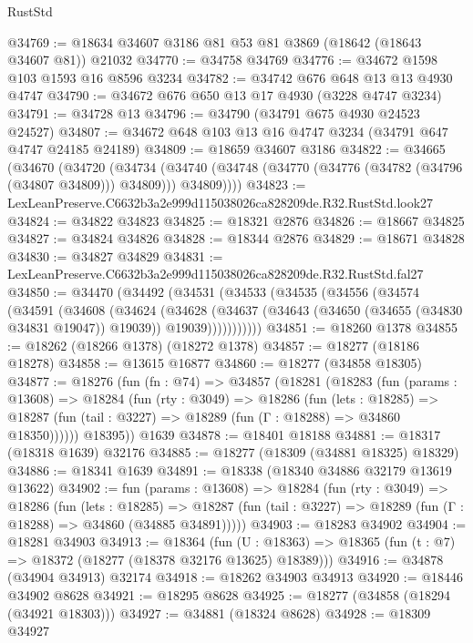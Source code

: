 \begin{lexlean}{RustStd}
\begin{coremodule}
@34769 := @18634 @34607 @3186 @81 @53 @81 @3869 (@18642 (@18643 @34607 @81)) @21032
@34770 := @34758 @34769
@34776 := @34672 @1598 @103 @1593 @16 @8596 @3234
@34782 := @34742 @676 @648 @13 @13 @4930 @4747
@34790 := @34672 @676 @650 @13 @17 @4930 (@3228 @4747 @3234)
@34791 := @34728 @13
@34796 := @34790 (@34791 @675 @4930 @24523 @24527)
@34807 := @34672 @648 @103 @13 @16 @4747 @3234 (@34791 @647 @4747 @24185 @24189)
@34809 := @18659 @34607 @3186
@34822 := @34665
    (@34670
      (@34720
        (@34734
          (@34740 (@34748 (@34770 (@34776 (@34782 (@34796 (@34807 @34809))) @34809))) @34809))))
@34823 := LexLeanPreserve.C6632b3a2e999d115038026ca828209de.R32.RustStd.look27
@34824 := @34822 @34823
@34825 := @18321 @2876
@34826 := @18667 @34825
@34827 := @34824 @34826
@34828 := @18344 @2876
@34829 := @18671 @34828
@34830 := @34827 @34829
@34831 := LexLeanPreserve.C6632b3a2e999d115038026ca828209de.R32.RustStd.fal27
@34850 := @34470
    (@34492
      (@34531
        (@34533
          (@34535
            (@34556
              (@34574
                (@34591
                  (@34608
                    (@34624
                      (@34628
                        (@34637
                          (@34643 (@34650 (@34655 (@34830 @34831 @19047)) @19039))
                          @19039)))))))))))
@34851 := @18260 @1378
@34855 := @18262 (@18266 @1378) (@18272 @1378)
@34857 := @18277 (@18186 @18278)
@34858 := @13615 @16877
@34860 := @18277 (@34858 @18305)
@34877 := @18276
    (fun (fn : @74) =>
    @34857
      (@18281
        (@18283
          (fun (params : @13608) =>
          @18284
            (fun (rty : @3049) =>
            @18286
              (fun (lets : @18285) =>
              @18287 (fun (tail : @3227) => @18289 (fun (Γ : @18288) => @34860 @18350))))))
        @18395))
    @1639
@34878 := @18401 @18188
@34881 := @18317 (@18318 @1639) @32176
@34885 := @18277 (@18309 (@34881 @18325) @18329)
@34886 := @18341 @1639
@34891 := @18338 (@18340 @34886 @32179 @13619 @13622)
@34902 := fun (params : @13608) =>
  @18284
    (fun (rty : @3049) =>
    @18286
      (fun (lets : @18285) =>
      @18287 (fun (tail : @3227) => @18289 (fun (Γ : @18288) => @34860 (@34885 @34891)))))
@34903 := @18283 @34902
@34904 := @18281 @34903
@34913 := @18364
    (fun (U : @18363) => @18365 (fun (t : @7) => @18372 (@18277 (@18378 @32176 @13625) @18389)))
@34916 := @34878 (@34904 @34913) @32174
@34918 := @18262 @34903 @34913
@34920 := @18446 @34902 @8628
@34921 := @18295 @8628
@34925 := @18277 (@34858 (@18294 (@34921 @18303)))
@34927 := @34881 (@18324 @8628)
@34928 := @18309 @34927

\end{coremodule}
\end{lexlean}
